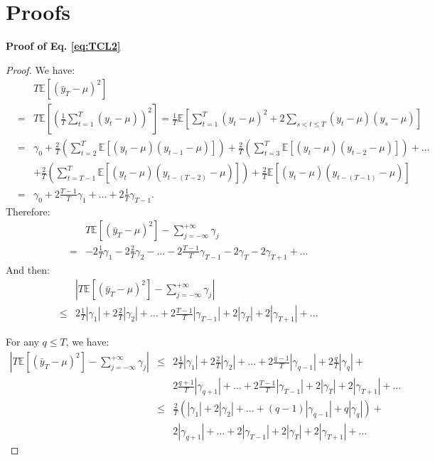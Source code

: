\documentclass[
  12pt,
]{book}
\theoremstyle{definition}
\theoremstyle{definition}
\theoremstyle{definition}
\theoremstyle{definition}
\theoremstyle{remark}
\begin{document}
\hypertarget{AppendixProof}{%
\section{Proofs}\label{AppendixProof}}

\textbf{Proof of Eq. \eqref{eq:TCL2}}

\begin{proof}
We have:
\begin{eqnarray*}
&&T\mathbb{E}\left[(\bar{y}_T - \mu)^2\right]\\
&=& T\mathbb{E}\left[\left(\frac{1}{T}\sum_{t=1}^T(y_t - \mu)\right)^2\right] = \frac{1}{T} \mathbb{E}\left[\sum_{t=1}^T(y_t - \mu)^2+2\sum_{s<t\le T}(y_t - \mu)(y_s - \mu)\right]\\
&=& \gamma_0 +\frac{2}{T}\left(\sum_{t=2}^{T}\mathbb{E}\left[(y_t - \mu)(y_{t-1} - \mu)\right]\right) +\frac{2}{T}\left(\sum_{t=3}^{T}\mathbb{E}\left[(y_t - \mu)(y_{t-2} - \mu)\right]\right) + \dots \\
&&+ \frac{2}{T}\left(\sum_{t=T-1}^{T}\mathbb{E}\left[(y_t - \mu)(y_{t-(T-2)} - \mu)\right]\right) + \frac{2}{T}\mathbb{E}\left[(y_t - \mu)(y_{t-(T-1)} - \mu)\right]\\
&=&  \gamma_0 + 2 \frac{T-1}{T}\gamma_1 + \dots + 2 \frac{1}{T}\gamma_{T-1} .
\end{eqnarray*}
Therefore:
\begin{eqnarray*}
&& T\mathbb{E}\left[(\bar{y}_T - \mu)^2\right] - \sum_{j=-\infty}^{+\infty} \gamma_j \\
&=& - 2\frac{1}{T}\gamma_1 - 2\frac{2}{T}\gamma_2 - \dots - 2\frac{T-1}{T}\gamma_{T-1} - 2\gamma_T - 2 \gamma_{T+1} + \dots
\end{eqnarray*}
And then:
\begin{eqnarray*}
&& \left|T\mathbb{E}\left[(\bar{y}_T - \mu)^2\right] - \sum_{j=-\infty}^{+\infty} \gamma_j\right|\\
&\le& 2\frac{1}{T}|\gamma_1| + 2\frac{2}{T}|\gamma_2| + \dots + 2\frac{T-1}{T}|\gamma_{T-1}| + 2|\gamma_T| + 2 |\gamma_{T+1}| + \dots
\end{eqnarray*}

For any \(q \le T\), we have:
\begin{eqnarray*}
\left|T\mathbb{E}\left[(\bar{y}_T - \mu)^2\right] - \sum_{j=-\infty}^{+\infty} \gamma_j\right| &\le& 2\frac{1}{T}|\gamma_1| + 2\frac{2}{T}|\gamma_2| + \dots + 2\frac{q-1}{T}|\gamma_{q-1}| +2\frac{q}{T}|\gamma_q| +\\
&&2\frac{q+1}{T}|\gamma_{q+1}| + \dots  + 2\frac{T-1}{T}|\gamma_{T-1}| + 2|\gamma_T| + 2 |\gamma_{T+1}| + \dots\\
&\le& \frac{2}{T}\left(|\gamma_1| + 2|\gamma_2| + \dots + (q-1)|\gamma_{q-1}| +q|\gamma_q|\right) +\\
&&2|\gamma_{q+1}| + \dots  + 2|\gamma_{T-1}| + 2|\gamma_T| + 2 |\gamma_{T+1}| + \dots
\end{eqnarray*}


\end{proof}
\end{document}
